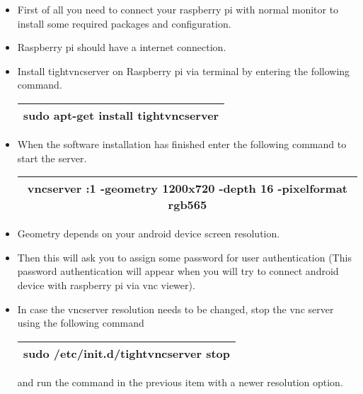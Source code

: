 \documentclass[journal,12pt,onecolumn]{IEEEtran}
\begin{document}
\begin{itemize}
\item First of all you need to connect your raspberry pi with normal monitor to install some required packages and configuration.

\item Raspberry pi should have a internet connection. 

\item Install tightvncserver on Raspberry pi via terminal by entering the following command.

\begin{table}[ht]
	\centering %
	\begin{tabular}{| c |} %
		\hline %
 			sudo apt-get install tightvncserver \\
		\hline
	\end{tabular}
	\centering
\end{table}

\item When the software installation has finished enter the following command to start the server. 

\begin{table}[ht]
	\centering %
	\begin{tabular}{| c |} %
		\hline %
 			vncserver :1 -geometry 1200x720 -depth 16 -pixelformat rgb565 \\
		\hline
	\end{tabular}
	\end{table}
\item Geometry depends on your android device screen resolution.
\item Then this will ask you to assign some password for user authentication (This password authentication will appear when you will try to connect android device with raspberry pi via vnc viewer).


\item In case the vncserver resolution needs to be changed, stop the vnc server using the following command 
\begin{table}[ht]
	\centering %
	\begin{tabular}{| c |} %
		\hline %
sudo /etc/init.d/tightvncserver stop \\
		\hline
	\end{tabular}
	\end{table}
	and run the command in the previous item with a newer resolution option.


\end{itemize}
\end{document}
